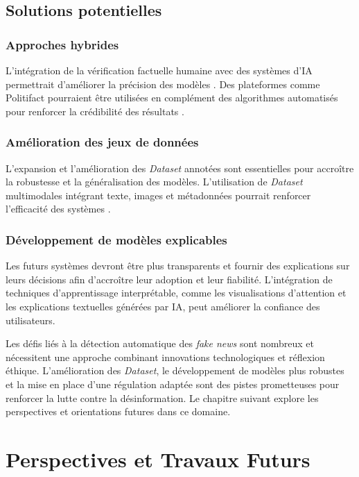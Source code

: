 \documentclass[a4paper,12pt, twocolumn]{article}
\begin{document}
\begin{twocolumn}
\subsection{Solutions potentielles}

\subsubsection{Approches hybrides}
L’intégration de la vérification factuelle humaine avec des systèmes d’IA permettrait d’améliorer la précision des modèles \cite{rai_fake_2022}. Des plateformes comme Politifact pourraient être utilisées en complément des algorithmes automatisés pour renforcer la crédibilité des résultats \cite{verma_welfake_2021}.

\subsubsection{Amélioration des jeux de données}
L’expansion et l’amélioration des \textit{Dataset} annotées sont essentielles pour accroître la robustesse et la généralisation des modèles. L’utilisation de \textit{Dataset} multimodales intégrant texte, images et métadonnées pourrait renforcer l’efficacité des systèmes \cite{roumeliotis_fake_2025}.

\subsubsection{Développement de modèles explicables}
Les futurs systèmes devront être plus transparents et fournir des explications sur leurs décisions afin d’accroître leur adoption et leur fiabilité. L’intégration de techniques d’apprentissage interprétable, comme les visualisations d’attention et les explications textuelles générées par IA, peut améliorer la confiance des utilisateurs.

\bigskip
Les défis liés à la détection automatique des \textit{fake news} sont nombreux et nécessitent une approche combinant innovations technologiques et réflexion éthique. L’amélioration des \textit{Dataset}, le développement de modèles plus robustes et la mise en place d’une régulation adaptée sont des pistes prometteuses pour renforcer la lutte contre la désinformation. Le chapitre suivant explore les perspectives et orientations futures dans ce domaine.


\section{Perspectives et Travaux Futurs}
\label{chap:perspectives}


\end{twocolumn}
\end{document}

